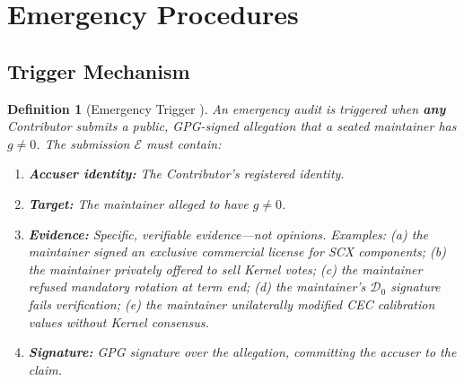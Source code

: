 \documentclass[12pt,a4paper]{article}
\newtheorem{definition}[theorem]{Definition}
\theoremstyle{definition}
\newcommand{\gnonzero}{g \neq 0}
\newcommand{\GzeroDecl}{\mathcal{D}_{0}}
\begin{document}
\section{Emergency Procedures}
\label{sec:emergency}
\subsection{Trigger Mechanism}
\begin{definition}[Emergency Trigger ]
\label{def:emergency_trigger}
An emergency audit is triggered when \textbf{any} Contributor submits a public, GPG-signed allegation that a seated maintainer has $\gnonzero$. The submission $\mathcal{E}$ must contain:
\begin{enumerate}[label=(\roman*)]
    \item \textbf{Accuser identity:} The Contributor's registered identity.
    \item \textbf{Target:} The maintainer alleged to have $\gnonzero$.
    \item \textbf{Evidence:} Specific, verifiable evidence---not opinions. Examples: (a) the maintainer signed an exclusive commercial license for SCX components; (b) the maintainer privately offered to sell Kernel votes; (c) the maintainer refused mandatory rotation at term end; (d) the maintainer's $\GzeroDecl$ signature fails verification; (e) the maintainer unilaterally modified CEC calibration values without Kernel consensus.
    \item \textbf{Signature:} GPG signature over the allegation, committing the accuser to the claim.
\end{enumerate}
\end{definition}
\end{document}
